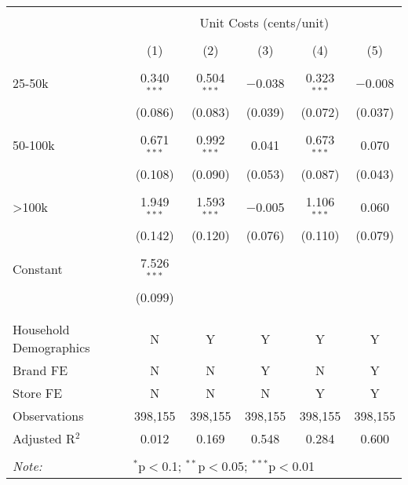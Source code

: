 
\begin{table}[!htbp] \centering 
  \caption{} 
  \label{} 
\begin{tabular}{@{\extracolsep{5pt}}lccccc} 
\\[-1.8ex]\hline 
\hline \\[-1.8ex] 
 & \multicolumn{5}{c}{Unit Costs (cents/unit)} \\ 
\cline{2-6} 
\\[-1.8ex] & (1) & (2) & (3) & (4) & (5)\\ 
\hline \\[-1.8ex] 
 25-50k & 0.340$^{***}$ & 0.504$^{***}$ & $-$0.038 & 0.323$^{***}$ & $-$0.008 \\ 
  & (0.086) & (0.083) & (0.039) & (0.072) & (0.037) \\ 
  & & & & & \\ 
 50-100k & 0.671$^{***}$ & 0.992$^{***}$ & 0.041 & 0.673$^{***}$ & 0.070 \\ 
  & (0.108) & (0.090) & (0.053) & (0.087) & (0.043) \\ 
  & & & & & \\ 
 >100k & 1.949$^{***}$ & 1.593$^{***}$ & $-$0.005 & 1.106$^{***}$ & 0.060 \\ 
  & (0.142) & (0.120) & (0.076) & (0.110) & (0.079) \\ 
  & & & & & \\ 
 Constant & 7.526$^{***}$ &  &  &  &  \\ 
  & (0.099) &  &  &  &  \\ 
  & & & & & \\ 
\hline \\[-1.8ex] 
Household Demographics & N & Y & Y & Y & Y \\ 
Brand FE & N & N & Y & N & Y \\ 
Store FE & N & N & N & Y & Y \\ 
Observations & 398,155 & 398,155 & 398,155 & 398,155 & 398,155 \\ 
Adjusted R$^{2}$ & 0.012 & 0.169 & 0.548 & 0.284 & 0.600 \\ 
\hline 
\hline \\[-1.8ex] 
\textit{Note:}  & \multicolumn{5}{l}{$^{*}$p$<$0.1; $^{**}$p$<$0.05; $^{***}$p$<$0.01} \\ 
\end{tabular} 
\end{table} 
